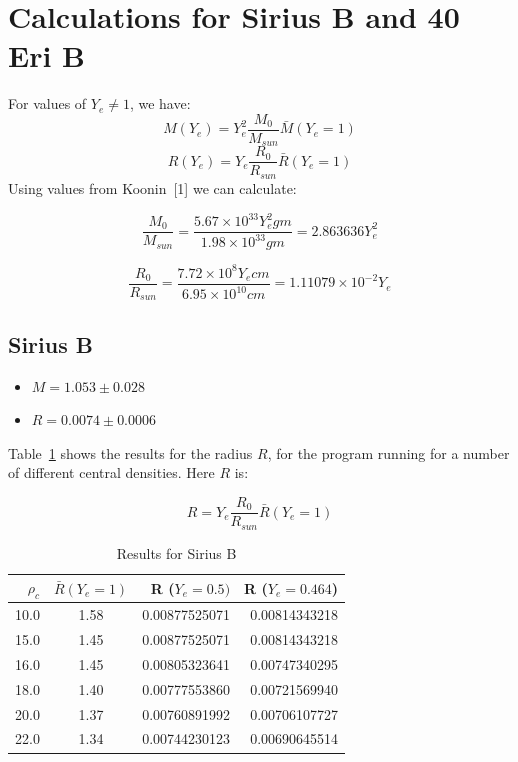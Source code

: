 \documentclass[a4paper]{IEEEtran}
\begin{document}
    \section{Calculations for Sirius B and 40 Eri B} 

    For values of $Y_e \not= 1$, we have:
    \[ M(Y_e) = Y_{e}^2 \frac{M_0}{M_{sun}} \bar{M}(Y_e = 1)\]
    \[ R(Y_e) = Y_e \frac{R_0}{R_{sun}} \bar{R}(Y_e = 1)\]
    Using values from Koonin~[1] we can calculate:

    \[ \frac{M_0}{M_{sun}} = 
        \frac{5.67 \times 10^{33} Y_e^2 gm}{1.98 \times 10^{33} gm} =  2.863636 Y_e^2\]

    \[ \frac{R_0}{R_{sun}} = 
        \frac{7.72 \times 10^8 Y_e cm}{6.95 \times 10^{10} cm} = 1.11079 \times 10^{-2} Y_e\]

    \subsection{Sirius B} 
    
    \begin{itemize} 
        \item $M = 1.053 \pm 0.028$ 
        \item $R = 0.0074 \pm 0.0006$ 
    \end{itemize} 
    
    Table~\ref{tbl:results-sirius-b} shows the results for the radius $R$, for the program 
    running for a number of different central densities. Here $R$ is:

    \[ R = Y_e \frac{R_0}{R_{sun}} \bar{R}(Y_e = 1) \]

    \begin{table} 
        \caption{Results for Sirius B} 
        \label{tbl:results-sirius-b} 
        \begin{center}
        \begin{tabular}{r|crr} \hline
        $\rho_c$    &   $\bar{R}(Y_e=1)$   & R ($Y_e = 0.5)$ & R ($Y_e = 0.464$)\\ \hline
        10.0        &   1.58        & 0.00877525071    & 0.00814343218   \\
        15.0        &   1.45        & 0.00877525071    & 0.00814343218   \\ 
        16.0        &   1.45        & 0.00805323641    & 0.00747340295 \\
        18.0        &   1.40        & 0.00777553860    & 0.00721569940\\ 
        20.0        &   1.37        & 0.00760891992    & 0.00706107727   \\ 
        22.0        &   1.34        & 0.00744230123    & 0.00690645514  \\ \hline
        \end{tabular}
        \end{center}
    \end{table} 
\end{document}
